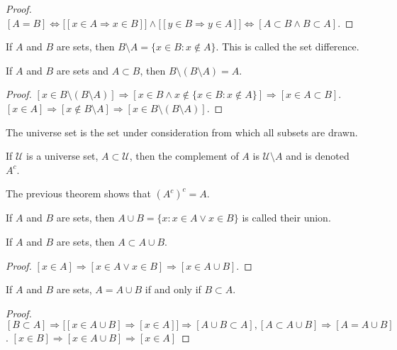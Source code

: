 \documentclass[crop=false,class=book]{standalone}
\begin{document}
\begin{proof}
$[A=B]\Leftrightarrow\big[[x\in A \Rightarrow x\in B]\big]\land \big[[y\in B \Rightarrow y\in A]\big]\Leftrightarrow [A\subset B\land B\subset A]$. 
\end{proof}
\begin{definition}
If $A$ and $B$ are sets, then $B\setminus A = \{x\in B:x\notin A\}$. This is called the set difference.
\end{definition}
\begin{theorem}
If $A$ and $B$ are sets and $A\subset B$, then $B\setminus(B\setminus A)=A$.
\end{theorem}
\begin{proof}
$[x\in B\setminus(B\setminus A)]\Rightarrow [x\in B \land x\notin \{x\in B:x\notin A\}]\Rightarrow [x\in A\subset B]$. $[x\in A]\Rightarrow [x\notin B\setminus A]\Rightarrow [x\in B\setminus(B\setminus A)]$.
\end{proof}
\begin{definition}
The universe set is the set under consideration from which all subsets are drawn.
\end{definition}
\begin{definition}
If $\mathcal{U}$ is a universe set, $A\subset \mathcal{U}$, then the complement of $A$ is $\mathcal{U}\setminus A$ and is denoted $A^c$.
\end{definition}
\begin{remark}
The previous theorem shows that $(A^c)^c = A$.
\end{remark}
\begin{definition}
If $A$ and $B$ are sets, then $A\cup B = \{x: x\in A \lor x\in B\}$ is called their union.
\end{definition}
\begin{corollary}
If $A$ and $B$ are sets, then $A\subset A\cup B$.
\end{corollary}
\begin{proof}
$[x\in A]\Rightarrow [x\in A\lor x\in B]\Rightarrow [x\in A\cup B]$.
\end{proof}
\begin{theorem}
If $A$ and $B$ are sets, $A=A\cup B$ if and only if $B\subset A$.
\end{theorem}
\begin{proof}
$[B\subset A]\Rightarrow \big[[x\in A\cup B] \Rightarrow [x\in A]\big]\Rightarrow[A\cup B \subset A], [A\subset A\cup B]\Rightarrow[A=A\cup B]$. $[x\in B] \Rightarrow [x\in A\cup B]\Rightarrow [x\in A]$
\end{proof}
\end{document}
